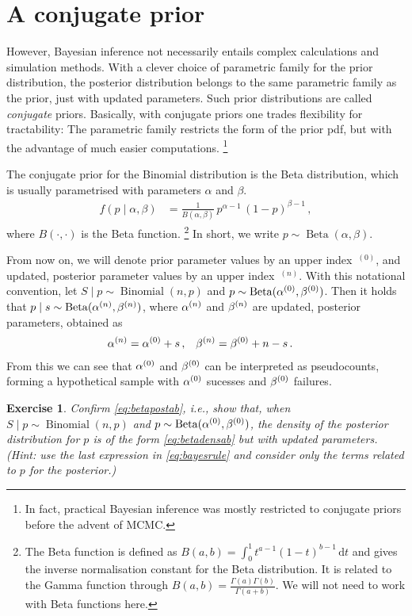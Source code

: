 \documentclass[12pt,a4paper	,twoside]{article}
\newcommand{\dd}{\,\mathrm{d}}
\newcommand{\uz}{^{(0)}} %
\newcommand{\un}{^{(n)}} %
\newcommand{\bin}{\operatorname{Binomial}}
\newcommand{\be}{\operatorname{Beta}}
\newtheorem{myex}{Exercise}
\begin{document}
\section{A conjugate prior}

However, Bayesian inference not necessarily entails complex calculations and simulation methods.
With a clever choice of parametric family for the prior distribution,
the posterior distribution belongs to the same parametric family as the prior,
just with updated parameters.
Such prior distributions are called \emph{conjugate} priors.
Basically, with conjugate priors one trades flexibility for tractability:
The parametric family restricts the form of the prior pdf,
but with the advantage of much easier computations.%
\footnote{In fact, practical Bayesian inference was mostly restricted to conjugate priors before the advent of MCMC.}

The conjugate prior for the Binomial distribution is the Beta distribution,
which is usually parametrised with parameters $\alpha$ and $\beta$.
\begin{align}
f(p\mid\alpha,\beta) &= \frac{1}{B(\alpha,\beta)}\, p^{\alpha-1}\, (1-p)^{\beta-1}\,,
\label{eq:betadensab}
\end{align}
where $B(\cdot,\cdot)$ is the Beta function.%
\footnote{The Beta function is defined as $B(a,b) = \int_0^1 t^{a-1} (1-t)^{b-1} \dd t$
and gives the inverse normalisation constant for the Beta distribution.
It is related to the Gamma function through $B(a,b) = \frac{\Gamma(a)\Gamma(b)}{\Gamma(a+b)}$.
We will not need to work with Beta functions here.}
In short, we write $p \sim \be(\alpha,\beta)$.

From now on, we will denote prior parameter values by an upper index~${}\uz$,
and updated, posterior parameter values by an upper index~${}\un$.
With this notational convention,
let $S\mid p \sim \bin(n,p)$ and $p \sim \be(\az,\bz)$.
Then it holds that $p \mid s \sim \be(\an,\bn)$,
where $\an$ and $\bn$ are updated, posterior parameters, obtained as
\begin{align}
\an &= \az + s\,, & \bn &= \bz + n - s \,.
\label{eq:betapostab}
\end{align}
From this we can see that $\az$ and $\bz$ can be interpreted as pseudocounts,
forming a hypothetical sample with $\az$ sucesses and $\bz$ failures.
\begin{myex}
Confirm \eqref{eq:betapostab}, i.e.,
show that, when $S\mid p \sim \bin(n,p)$ and $p \sim \be(\az,\bz)$,
the density of the posterior distribution for $p$ is of the form \eqref{eq:betadensab}
but with updated parameters.
(Hint: use the last expression in \eqref{eq:bayesrule}
and consider only the terms related to $p$ for the posterior.)
\end{myex}
\end{document}
